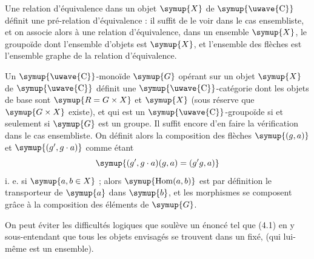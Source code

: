 Une relation d'équivalence dans un objet $\symup{X}$ de $\symup{\text{\uwave{C}}}$ définit une
pré-relation d'équivalence : il suffit de le voir dans le cas ensembliste, et
on associe alors à une relation d'équivalence, dans un ensemble $\symup{X}$, le
groupoïde dont l'ensemble d'objets est $\symup{X}$, et l'ensemble des flèches est
l'ensemble graphe de la relation d'équivalence.

Un $\symup{\text{\uwave{C}}}$-monoïde $\symup{G}$ opérant sur un objet $\symup{X}$ de $\symup{\text{\uwave{C}}}$ définit
une $\symup{\text{\uwave{C}}}$-catégorie dont les objets de base sont $\symup{R=G\times X}$ et $\symup{X}$
(sous réserve que $\symup{G\times X}$ existe), et qui est un $\symup{\text{\uwave{C}}}$-groupoïde
si et seulement si $\symup{G}$ est un groupe. Il suffit encore d'en faire la
vérification dans le cas ensembliste. On définit alors la composition des
flèches $\symup{(g,a)}$ et $\symup{(g',g\cdot a)}$ comme étant
\[
  \symup{(g',g\cdot a)(g,a)=(g'g,a)}
\]
i. e. si $\symup{a,b\in X}$ ; alors $\symup{\operatorname{Hom}(a,b)}$ est par définition le
transporteur de $\symup{a}$ dans $\symup{b}$, et les morphismes se composent grâce à la
composition des éléments de $\symup{G}$.

 On peut éviter les difficultés logiques que
soulève un énoncé tel que (4.1) en y sous-entendant que tous les objets
envisagés se trouvent dans un  fixé, (qui lui-même est un
ensemble).


